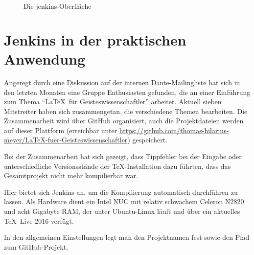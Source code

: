 \begin{figure}
\caption{Die jenkins-Oberfläche}\label{fig:NewJob}
\end{figure}

\section{Jenkins in der praktischen Anwendung}

Angeregt durch eine Diskussion auf der internen Dante-Mailingliste hat sich in den letzten Monaten eine Gruppe Enthusiasten gefunden, die an einer Einführung zum Thema \enquote{\LaTeX\ für Geisteswissenschaftler} arbeitet. Aktuell sieben Mitstreiter haben sich zusammengetan, die verschiedene Themen bearbeiten. Die Zusammenarbeit wird über GitHub organisiert, auch die Projektdateien werden auf dieser Plattform (erreichbar unter \url{https://github.com/thomas-hilarius-meyer/LaTeX-fuer-Geisteswissenschaftler}) gespeichert. 

Bei der Zusammenarbeit hat sich gezeigt, dass Tippfehler bei der Eingabe oder unterschiedliche Versionsstände der \TeX-Installation dazu führten, dass das Gesamtprojekt nicht mehr kompilierbar war. 

Hier bietet sich Jenkins an, um die Kompilierung automatisch durchführen zu lassen. Als Hardware dient ein Intel NUC mit relativ schwachem Celeron N2820 und acht Gigabyte RAM, der unter Ubuntu-Linux läuft und über ein aktuelles \TeX\ Live 2016 verfügt.

In den allgemeinen Einstellungen legt man den Projektnamen fest sowie den Pfad zum GitHub-Projekt.


